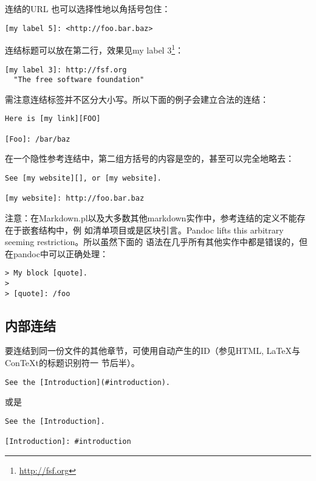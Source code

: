 \documentclass[fancyhdr,bookmark]{ctexbook}
\renewcommand{\href}[2]{#2\footnote{\url{#1}}}
\begin{document}
连结的URL 也可以选择性地以角括号包住：

\begin{lstlisting}
[my label 5]: <http://foo.bar.baz>
\end{lstlisting}

连结标题可以放在第二行，效果见\href{http://fsf.org}{my label 3}：

\begin{lstlisting}
[my label 3]: http://fsf.org
  "The free software foundation"
\end{lstlisting}

需注意连结标签并不区分大小写。所以下面的例子会建立合法的连结：

\begin{lstlisting}
Here is [my link][FOO]

[Foo]: /bar/baz
\end{lstlisting}

在一个隐性参考连结中，第二组方括号的内容是空的，甚至可以完全地略去：

\begin{lstlisting}
See [my website][], or [my website].

[my website]: http://foo.bar.baz
\end{lstlisting}

注意：在Markdown.pl以及大多数其他markdown实作中，参考连结的定义不能存在于嵌套结构中，例
如清单项目或是区块引言。Pandoc lifts this arbitrary seeming
restriction。所以虽然下面的
语法在几乎所有其他实作中都是错误的，但在pandoc中可以正确处理：

\begin{lstlisting}
> My block [quote].
>
> [quote]: /foo
\end{lstlisting}

\subsection{内部连结}\label{ux5185ux90e8ux8fdeux7ed3}

要连结到同一份文件的其他章节，可使用自动产生的ID（参见HTML,
LaTeX与ConTeXt的标题识别符一 节后半）。

\begin{lstlisting}
See the [Introduction](#introduction).
\end{lstlisting}

或是

\begin{lstlisting}
See the [Introduction].

[Introduction]: #introduction
\end{lstlisting}
\end{document}

